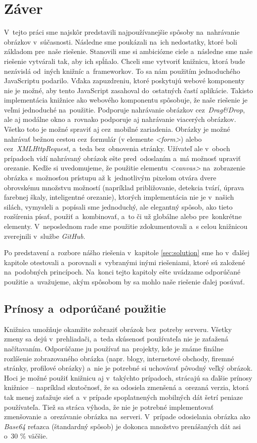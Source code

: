 \chapter{Záver}
V~tejto práci sme najskôr predstavili najpoužívanejšie spôsoby na~nahrávanie obrázkov v~súčasnosti. Následne sme poukázali na~ich nedostatky, ktoré boli základom pre~naše riešenie. Stanovili sme si ambiciózne ciele a~následne sme naše riešenie vytvárali tak, aby ich spĺňalo.
Chceli sme vytvoriť knižnicu, ktorá bude nezávislá od~iných knižníc a~frameworkov. To sa nám použitím jednoduchého JavaScriptu podarilo. Vďaka zapuzdreniu, ktoré poskytujú webové komponenty nie je možné, aby tento JavaScript zasahoval do~ostatných častí aplikácie. Takisto implementácia knižnice ako webového  komponentu spôsobuje, že naše riešenie je veľmi jednoduché na~použitie.
Podporuje nahrávanie obrázkov cez~\emph{Drag\&Drop}, ale aj modálne okno a~rovnako podporuje aj nahrávanie viacerých obrázkov. Všetko toto je možné spraviť aj cez~mobilné zariadenia. Obrázky je možné nahrávať bežnou cestou cez~formulár (v elemente \emph{<form>}) alebo cez~\emph{XMLHttpRequest}, a~teda bez~obnovenia stránky. Užívateľ ale v~oboch prípadoch vidí nahrávaný obrázok ešte pred~odoslaním a~má možnosť upraviť orezanie.
Keďže si uvedomujeme, že použitie elementu \emph{<canvas>} na~zobrazenie obrázka s~možnosťou prístupu až k~jednotlivým pixelom otvára dvere obrovskému množstvu možností (napríklad približovanie, detekcia tvárí, úprava farebnej škaly, inteligentné orezanie), ktorých implementácia nie je v~našich silách, vymysleli a~popísali sme jednoduchý, ale elegantný spôsob, ako tieto rozšírenia písať, použiť a~kombinovať, a~to či už globálne alebo pre~konkrétne elementy. V~neposlednom rade sme použitie zdokumentovali a~s celou knižnicou zverejnili v~službe \emph{GitHub}.

Po predstavení a~rozbore nášho riešenia v~kapitole \ref{sec:solution} sme ho v~ďalšej kapitole otestovali a~porovnali s~vybranými inými riešeniami, ktoré sú založené na~podobných princípoch. Na~konci tejto kapitoly ešte uvádzame odporúčané použitie a~uvažujeme, akým spôsobom by sa mohlo naše riešenie ďalej posúvať. 


\section{Prínosy a~odporúčané použitie}

Knižnica umožňuje okamžite zobraziť obrázok bez~potreby serveru. Všetky zmeny sa dejú v~prehliadači, a~teda skúsenosť používateľa nie je zaťažená načítavaním. Odporúčame ju používať na~projekty, kde je známe finálne rozlíšenie zobrazovaného obrázka (napr. blogy, internetové obchody, firemné stránky, profilové obrázky) a~nie je potrebné si uchovávať pôvodný veľký obrázok. Hoci je možné použiť knižnicu aj v~takýchto prípadoch, strácajú sa ďalšie prínosy knižnice -- napríklad skutočnosť, že sa odosiela zmenšená a~orezaná verzia, ktorá tak menej zaťažuje sieť a~v prípade spoplatnených mobilných dát šetrí peniaze používateľa. Tiež sa stráca výhoda, že nie je potrebné implementovať zmenšovanie a~orezávanie obrázka na~serveri. V~prípade odosielania obrázka ako \emph{Base64} reťazca (štandardný spôsob) je dokonca množstvo prenášaných dát asi o~30 \% väčšie.


